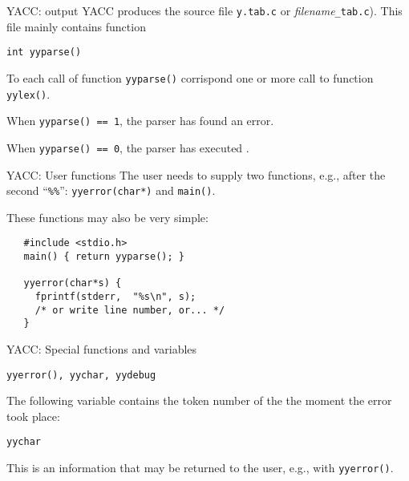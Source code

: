\begin{frame}[fragile]{YACC: output}
YACC produces the source file {\tt y.tab.c}
or {\em filename}{\tt \_tab.c}). This file mainly contains
function


\vspace{20pt}

\begin{center}\tt int yyparse()\end{center}


\vspace{20pt}

To each call of function
{\tt yyparse()} corrispond one or more call to function
{\tt yylex()}.


\vspace{20pt}

When {\tt yyparse() == 1}, the parser has found an error.


\vspace{20pt}

When {\tt yyparse() == 0}, the parser has executed \accept.




\end{frame}
\begin{frame}[fragile]{YACC: User functions}
The user needs to supply two functions, e.g.,
after the second  ``\verb"%%"'':
{\tt yyerror(char*)} and {\tt main()}.


\vspace{20pt}

These functions may also be very simple:

\begin{verbatim}
   #include <stdio.h>
   main() { return yyparse(); }

   yyerror(char*s) {
     fprintf(stderr,  "%s\n", s);
     /* or write line number, or... */
   }    
\end{verbatim}






\end{frame}
\begin{frame}[fragile]{YACC: Special functions and variables}
\begin{center}\tt yyerror(), yychar, yydebug\end{center}
The following variable contains the token number of the \lat{}
the moment the error took place:
\begin{center}
{\tt yychar}
\end{center}


\vspace{20pt}

This is an information that may be returned to the user, e.g.,
with {\tt yyerror()}.



\end{frame}
